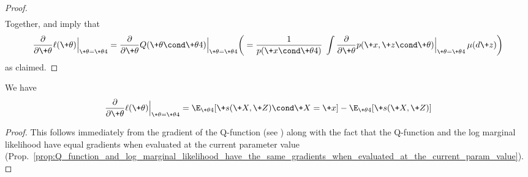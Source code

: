 \documentclass{article} %
\newcommand{\sufficientStatsFunction}{\+s}
\newcommand{\param}{\+\theta}
\begin{document}
\begin{proof}
\begin{align*}
\end{align*}
%
Together,  and  imply that
%
\begin{align*}
\frac{\partial }{\partial \param} \ell(\param) \Bigr|_{\param = \param^^t} = \frac{\partial }{\partial \param} Q(\param \cond \param^^t) \Bigr|_{\param = \param^^t} \bigg( = \frac{1}{p(\+x \cond \param^^t)} \;  \int \frac{\partial}{\partial \param}  p(\+x, \+z \cond \param) \Bigr|_{\param=\param^^t} \, \mu(d\+z) \bigg)
\end{align*}
as claimed.

\end{proof}


\begin{corollary}

We have 
%
\begin{align}
\frac{\partial }{\partial \param} \ell(\param) \Bigr|_{\param = \param^^t} = \E_{\param^^t}[\sufficientStatsFunction(\+X,\+Z) \cond \+X=\+x] - 	\E_{\param^^t}[\sufficientStatsFunction(\+X,\+Z)]
\label{eqn:ordinary_gradient_of_log_marginal_likelihood_of_an_exponential_family_latent_variable_model}
\end{align}
%
\label{cor:ordinary_gradient_of_log_marginal_likelihood_of_an_exponential_family_latent_variable_model}
\end{corollary}

\begin{proof}
This follows immediately from the gradient of the Q-function (see ) along with the fact that the Q-function and the log marginal likelihood have equal gradients when evaluated at the current parameter value (Prop.~\ref{prop:Q_function_and_log_marginal_likelihood_have_the_same_gradients_when_evaluated_at_the_current_param_value}).	
\end{proof}
\end{document}
